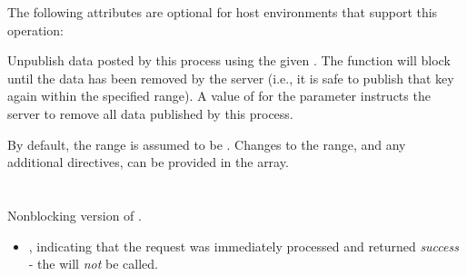 \optattrstart
The following attributes are optional for host environments that support this operation:


\optattrend

\descr

Unpublish data posted by this process using the given .
The function will block until the data has been removed by the server (i.e., it is safe to publish that key again within the specified range).
A value of  for the  parameter instructs the server to remove all data published by this process.

By default, the range is assumed to be .
Changes to the range, and any additional directives, can be provided in the  array.


\section{}

\summary

Nonblocking version of .

\format


\begin{arglist}
\end{arglist}

\returnsimplenb

\returnstart
\begin{itemize}
    \item {}, indicating that the request was immediately processed and returned \textit{success} - the  will \textit{not} be called.
\end{itemize}
\returnend

